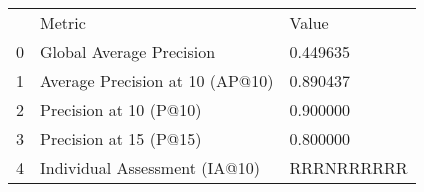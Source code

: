 \begin{tabular}{lll}
 & Metric & Value \\
0 & Global Average Precision & 0.449635 \\
1 & Average Precision at 10 (AP@10) & 0.890437 \\
2 & Precision at 10 (P@10) & 0.900000 \\
3 & Precision at 15 (P@15) & 0.800000 \\
4 & Individual Assessment (IA@10) & RRRNRRRRRR \\
\end{tabular}
